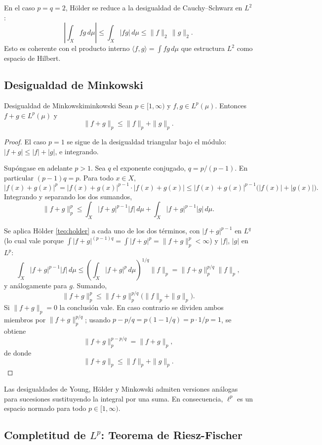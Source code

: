 \documentclass[11pt, a4paper]{article}
\begin{document}
\obs En el caso $p = q = 2$, H\"older se reduce a la desigualdad de Cauchy--Schwarz en $L^2$:
$$ \left| \int_X fg \, d\mu \right| \le \int_X |fg| \, d\mu \le \|f\|_2 \, \|g\|_2. $$
Esto es coherente con el producto interno $\langle f, g \rangle = \int fg \, d\mu$ que estructura
$L^2$ como espacio de Hilbert.

\subsection{Desigualdad de Minkowski}

\begin{teorema}{Desigualdad de Minkowski}{minkowski}
Sean $p \in [1, \infty)$ y $f, g \in L^p(\mu)$. Entonces $f + g \in L^p(\mu)$ y
$$ \|f + g\|_p \le \|f\|_p + \|g\|_p. $$
\end{teorema}

\begin{proof}
El caso $p = 1$ se sigue de la desigualdad triangular bajo el módulo: $|f + g| \le |f| + |g|$,
e integrando.

Supóngase en adelante $p > 1$. Sea $q$ el exponente conjugado, $q = p/(p-1)$. En particular
$(p - 1)q = p$. Para todo $x \in X$,
$$ |f(x) + g(x)|^p = |f(x) + g(x)|^{p-1} \cdot |f(x) + g(x)| \le |f(x) + g(x)|^{p-1}
\big(|f(x)| + |g(x)|\big). $$
Integrando y separando los dos sumandos,
$$ \|f + g\|_p^p \le \int_X |f + g|^{p-1} |f| \, d\mu + \int_X |f + g|^{p-1} |g| \, d\mu. $$

Se aplica H\"older \ref{teo:holder} a cada uno de los dos términos, con $|f + g|^{p-1}$ en $L^q$ (lo cual vale
porque $\int |f + g|^{(p-1)q} = \int |f + g|^p = \|f + g\|_p^p < \infty$) y $|f|$, $|g|$ en $L^p$:
$$ \int_X |f + g|^{p-1} |f| \, d\mu \le \left(\int_X |f + g|^p \, d\mu\right)^{1/q} \|f\|_p
= \|f + g\|_p^{p/q} \|f\|_p, $$
y análogamente para $g$. Sumando,
$$ \|f + g\|_p^p \le \|f + g\|_p^{p/q} \big(\|f\|_p + \|g\|_p\big). $$
Si $\|f + g\|_p = 0$ la conclusión vale. En caso contrario se dividen ambos miembros por
$\|f + g\|_p^{p/q}$; usando $p - p/q = p(1 - 1/q) = p \cdot 1/p = 1$, se obtiene
$$ \|f + g\|_p^{p - p/q} = \|f + g\|_p, $$
de donde
$$ \|f + g\|_p \le \|f\|_p + \|g\|_p. $$
\end{proof}

\obs Las desigualdades de Young, H\"older y Minkowski admiten versiones análogas para sucesiones
sustituyendo la integral por una suma. En consecuencia, $\ell^p$ es un espacio normado para todo
$p \in [1, \infty)$.

\subsection{\texorpdfstring{Completitud de $L^p$: Teorema de Riesz-Fischer}{Completitud de Lp:
Teorema de Riesz-Fischer}}
\end{document}
